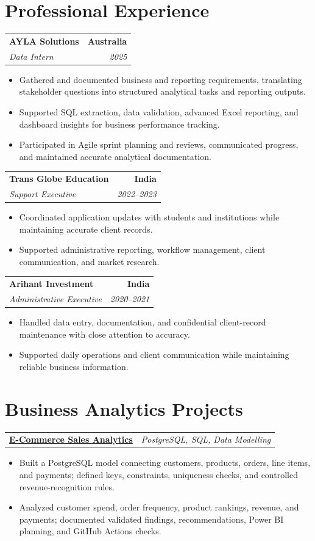 \documentclass[letterpaper,10pt]{article}
\makeatletter
\newcommand{\role}[4]{%
  \begin{tabularx}{\textwidth}{@{}Xr@{}}
    \textbf{#1} & \textbf{#2} \\
    \textit{#3} & \textit{#4}
  \end{tabularx}\vspace{-1pt}
}
\newcommand{\project}[2]{%
  \begin{tabularx}{\textwidth}{@{}Xr@{}}
    \textbf{#1} & \textit{#2}
  \end{tabularx}\vspace{-1pt}
}
\makeatother
\begin{document}
\section{Professional Experience}
\role{AYLA Solutions}{Australia}{Data Intern}{2025}
\begin{itemize}
  \item Gathered and documented business and reporting requirements, translating stakeholder questions into structured analytical tasks and reporting outputs.
  \item Supported SQL extraction, data validation, advanced Excel reporting, and dashboard insights for business performance tracking.
  \item Participated in Agile sprint planning and reviews, communicated progress, and maintained accurate analytical documentation.
\end{itemize}
\vspace{1pt}

\role{Trans Globe Education}{India}{Support Executive}{2022--2023}
\begin{itemize}
  \item Coordinated application updates with students and institutions while maintaining accurate client records.
  \item Supported administrative reporting, workflow management, client communication, and market research.
\end{itemize}
\vspace{1pt}

\role{Arihant Investment}{India}{Administrative Executive}{2020--2021}
\begin{itemize}
  \item Handled data entry, documentation, and confidential client-record maintenance with close attention to accuracy.
  \item Supported daily operations and client communication while maintaining reliable business information.
\end{itemize}

\section{Business Analytics Projects}
\project{\href{https://github.com/jainalimehta/Ecommerce-Sales-Analytics}{E-Commerce Sales Analytics}}{PostgreSQL, SQL, Data Modelling}
\begin{itemize}
  \item Built a PostgreSQL model connecting customers, products, orders, line items, and payments; defined keys, constraints, uniqueness checks, and controlled revenue-recognition rules.
  \item Analyzed customer spend, order frequency, product rankings, revenue, and payments; documented validated findings, recommendations, Power BI planning, and GitHub Actions checks.
\end{itemize}
\vspace{1pt}
\end{document}
